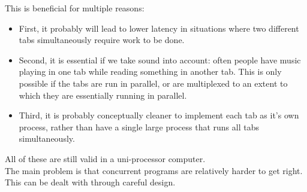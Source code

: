 This is beneficial for multiple reasons:
\begin{itemize}
\item First, it probably will lead to lower latency in situations where two different tabs simultaneously require work to be done.
\item Second, it is essential if we take sound into account: often people have music playing in one tab while reading something in another tab. This is only possible if the tabs are run in parallel, or are multiplexed to an extent to which they are essentially running in parallel.
\item Third, it is probably conceptually cleaner to implement each tab as it's own process, rather than have a single large process that runs all tabs simultaneously.
\end{itemize}
All of these are still valid in a uni-processor computer. \\
The main problem is that concurrent programs are relatively harder to get right. This can be dealt with through careful design.

